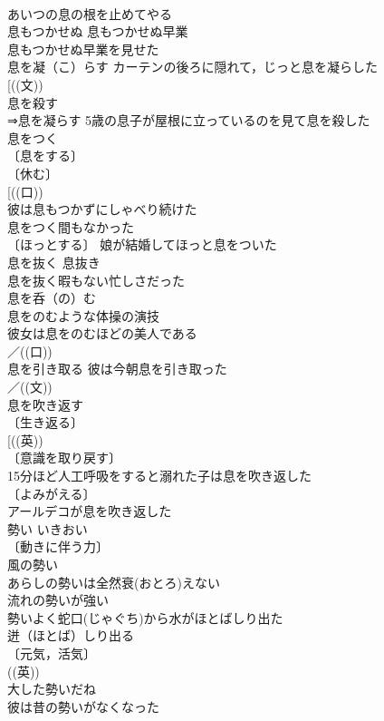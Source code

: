 \documentclass[8pt]{extreport}
\begin{document}
\begin{CJK}{UTF8}{min}
\\	あいつの息の根を止めてやる 
\\	息もつかせぬ 息もつかせぬ早業 
\\	息もつかせぬ早業を見せた 
\\	息を凝（こ）らす カーテンの後ろに隠れて，じっと息を凝らした 
\\	[((文))
\\	息を殺す 
\\	⇒息を凝らす 5歳の息子が屋根に立っているのを見て息を殺した 
\\	息をつく 
\\	〔息をする〕
\\	〔休む〕
\\	[((口)) 
\\	彼は息もつかずにしゃべり続けた 
\\	息をつく間もなかった 
\\	〔ほっとする〕 娘が結婚してほっと息をついた 
\\	息を抜く 息抜き　
\\	息を抜く暇もない忙しさだった 
\\	息を呑（の）む　
\\	息をのむような体操の演技 
\\	彼女は息をのむほどの美人である 
\\	／((口)) 
\\	息を引き取る 彼は今朝息を引き取った 
\\	／((文))
\\	息を吹き返す 
\\	〔生き返る〕
\\	[((英)) 
\\	〔意識を取り戻す〕
\\	15分ほど人工呼吸をすると溺れた子は息を吹き返した 
\\	〔よみがえる〕
\\	アールデコが息を吹き返した 
\\	勢い	いきおい	
\\	〔動きに伴う力〕
\\	風の勢い 
\\	あらしの勢いは全然衰(おとろ)えない 
\\	流れの勢いが強い 
\\	勢いよく蛇口(じゃぐち)から水がほとばしり出た 
\\	迸（ほとば）しり出る　
\\	〔元気，活気〕
\\	((英)) 
\\	大した勢いだね 
\\	彼は昔の勢いがなくなった 

\end{CJK}
\end{document}
